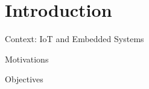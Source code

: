 \section*{Introduction}

\begin{frame}{Context: IoT and Embedded Systems}
    
\end{frame}

\begin{frame}{Motivations}
    
\end{frame}
\begin{frame}{Objectives}
    
\end{frame}
